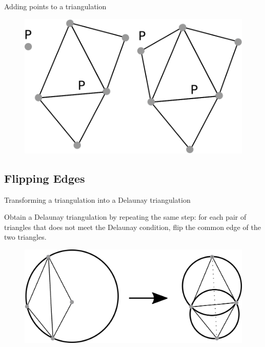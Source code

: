 \documentclass[18pt]{beamer}
\begin{document}
\begin{frame}{Adding points to a triangulation}
\begin{overprint}
  
  \begin{figure}
\centering
\includegraphics[scale=0.8]{adding3}
\end{figure}

\end{overprint}


\end{frame}


\subsection{Flipping Edges}
\begin{frame}{Transforming a triangulation into a Delaunay triangulation}

Obtain a Delaunay triangulation by repeating the same step: for each pair of triangles that does not meet the Delaunay condition, flip the common edge of the two triangles.

\begin{figure}
\centering
\includegraphics[scale=1]{dessin1}
\end{figure}
 
\end{frame}
\end{document}
